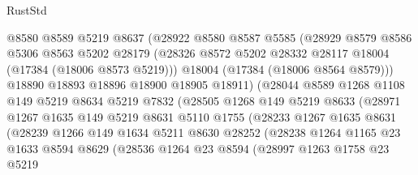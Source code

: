 \begin{lexlean}{RustStd}
\begin{coremodule}
                      @8580
                      @8589
                      @5219
                      @8637
                      (@28922
                        @8580
                        @8587
                        @5585
                        (@28929
                          @8579
                          @8586
                          @5306
                          @8563
                          @5202
                          @28179
                          (@28326 @8572 @5202 @28332 @28117 @18004 (@17384 (@18006 @8573 @5219)))
                          @18004
                          (@17384 (@18006 @8564 @8579)))
                        @18890
                        @18893
                        @18896
                        @18900
                        @18905
                        @18911)
                      (@28044
                        @8589
                        @1268
                        @1108
                        @149
                        @5219
                        @8634
                        @5219
                        @7832
                        (@28505
                          @1268
                          @149
                          @5219
                          @8633
                          (@28971
                            @1267
                            @1635
                            @149
                            @5219
                            @8631
                            @5110
                            @1755
                            (@28233
                              @1267
                              @1635
                              @8631
                              (@28239
                                @1266
                                @149
                                @1634
                                @5211
                                @8630
                                @28252
                                (@28238
                                  @1264
                                  @1165
                                  @23
                                  @1633
                                  @8594
                                  @8629
                                  (@28536
                                    @1264
                                    @23
                                    @8594
                                    (@28997
                                      @1263
                                      @1758
                                      @23
                                      @5219

\end{coremodule}
\end{lexlean}
